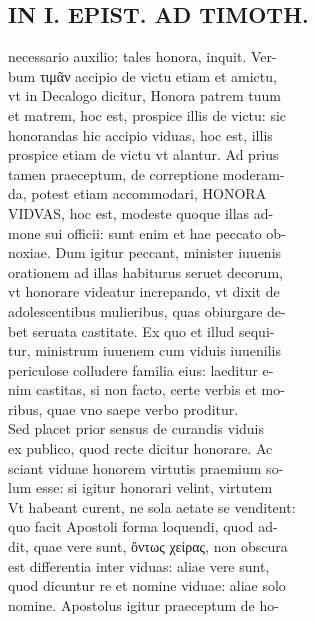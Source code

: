 \documentclass{article}
\begin{document}
\begin{pages}
\section*{IN I. EPIST. AD TIMOTH. \\
                }necessario auxilio: tales honora, inquit. Ver- \\
                bum τιμᾶν accipio de victu etiam et amictu, \\
                vt in Decalogo dicitur, Honora patrem tuum \\
                et matrem, hoc est, prospice illis de victu: sic \\
                honorandas hic accipio viduas, hoc est, illis \\
                prospice etiam de victu vt alantur. Ad prius \\
                tamen praeceptum, de correptione moderam- \\
                da, potest etiam accommodari, HONORA \\
                VIDVAS, hoc est, modeste quoque illas ad- \\
                mone sui officii: sunt enim et hae peccato ob- \\
                noxiae. Dum igitur peccant, minister iuuenis \\
                orationem ad illas habiturus seruet decorum, \\
                vt honorare videatur increpando, vt dixit de \\
                adolescentibus mulieribus, quas obiurgare de- \\
                bet seruata castitate. Ex quo et illud sequi- \\
                tur, ministrum iuuenem cum viduis iuuenilis \\
                periculose colludere familia eius: laeditur e- \\
                nim castitas, si non facto, certe verbis et mo- \\
                ribus, quae vno saepe verbo proditur. \\
                Sed placet prior sensus de curandis viduis \\
                ex publico, quod recte dicitur honorare. Ac \\
                sciant viduae honorem virtutis praemium so- \\
                lum esse: si igitur honorari velint, virtutem \\
                Vt habeant curent, ne sola aetate se venditent: \\
                quo facit Apostoli forma loquendi, quod ad- \\
                dit, quae vere sunt, ὄντως χείρας, non obscura \\
                est differentia inter viduas: aliae vere sunt, \\
                quod dicuntur re et nomine viduae: aliae solo \\
                nomine. Apostolus igitur praeceptum de ho- \\
                

\end{pages}
\end{document}
